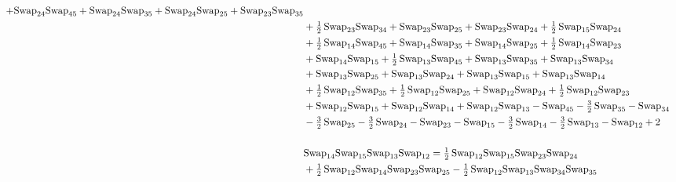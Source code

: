 \documentclass[12pt,dvipsnames,accepted=2016-08-18,a4paper,onecolumn]{quantumarticle}
\numberwithin{equation}{section}
\theoremstyle{definition}
\begin{document}
\begin{align*}
          + \textnormal{Swap}_{24} \textnormal{Swap}_{45}  + \textnormal{Swap}_{24} \textnormal{Swap}_{35} + \textnormal{Swap}_{24} \textnormal{Swap}_{25} + \textnormal{Swap}_{23} \textnormal{Swap}_{35}\\ & + \tfrac12\,\textnormal{Swap}_{23} \textnormal{Swap}_{34} + \textnormal{Swap}_{23} \textnormal{Swap}_{25} +
        \textnormal{Swap}_{23} \textnormal{Swap}_{24} + \tfrac12\,\textnormal{Swap}_{15} \textnormal{Swap}_{24} \\ & + \tfrac12\,\textnormal{Swap}_{14} \textnormal{Swap}_{45} + \textnormal{Swap}_{14} \textnormal{Swap}_{35} + \textnormal{Swap}_{14} \textnormal{Swap}_{25} + \tfrac12\,\textnormal{Swap}_{14} \textnormal{Swap}_{23} \\ &+
        \textnormal{Swap}_{14} \textnormal{Swap}_{15} + \tfrac12\,\textnormal{Swap}_{13} \textnormal{Swap}_{45} + \textnormal{Swap}_{13} \textnormal{Swap}_{35} + \textnormal{Swap}_{13} \textnormal{Swap}_{34} \\ & + \textnormal{Swap}_{13} \textnormal{Swap}_{25} + \textnormal{Swap}_{13} \textnormal{Swap}_{24} + \textnormal{Swap}_{13} \textnormal{Swap}_{15}
        + \textnormal{Swap}_{13} \textnormal{Swap}_{14}\\ & + \tfrac12\,\textnormal{Swap}_{12} \textnormal{Swap}_{35} + \tfrac12\,\textnormal{Swap}_{12} \textnormal{Swap}_{25} + \textnormal{Swap}_{12} \textnormal{Swap}_{24} + \tfrac12\,\textnormal{Swap}_{12} \textnormal{Swap}_{23}\\ & + \textnormal{Swap}_{12} \textnormal{Swap}_{15}
        + \textnormal{Swap}_{12} \textnormal{Swap}_{14} + \textnormal{Swap}_{12} \textnormal{Swap}_{13} - \textnormal{Swap}_{45} - \tfrac32\,\textnormal{Swap}_{35} - \textnormal{Swap}_{34} \\ & - \tfrac32\,\textnormal{Swap}_{25}  - \tfrac32\,\textnormal{Swap}_{24} - \textnormal{Swap}_{23} -
        \textnormal{Swap}_{15} - \tfrac32\,\textnormal{Swap}_{14} - \tfrac32\,\textnormal{Swap}_{13} - \textnormal{Swap}_{12} + 2 \\
        \\ 
        &\textnormal{Swap}_{14}   \textnormal{Swap}_{15}   \textnormal{Swap}_{13}   \textnormal{Swap}_{12} = \tfrac12\,\textnormal{Swap}_{12} \textnormal{Swap}_{15} \textnormal{Swap}_{23} \textnormal{Swap}_{24}\\ &
        + \tfrac12\,\textnormal{Swap}_{12} \textnormal{Swap}_{14} \textnormal{Swap}_{23} \textnormal{Swap}_{25} 
        - \tfrac12\,\textnormal{Swap}_{12} \textnormal{Swap}_{13} \textnormal{Swap}_{34} \textnormal{Swap}_{35} \\ &

\end{align*}
\end{document}
